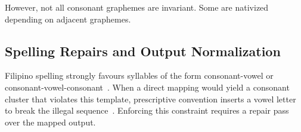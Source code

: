 However, not all consonant graphemes are invariant. Some are nativized
depending on adjacent graphemes.

\subsection{Spelling Repairs and Output Normalization}

Filipino spelling strongly favours syllables of the form consonant-vowel or
consonant-vowel-consonant~\cite{llamzon1966,magpale2024}. When a direct mapping
would yield a consonant cluster that violates this template, prescriptive
convention inserts a vowel letter to break the illegal
sequence~\cite{almario2014}. Enforcing this constraint requires a repair pass
over the mapped output.

